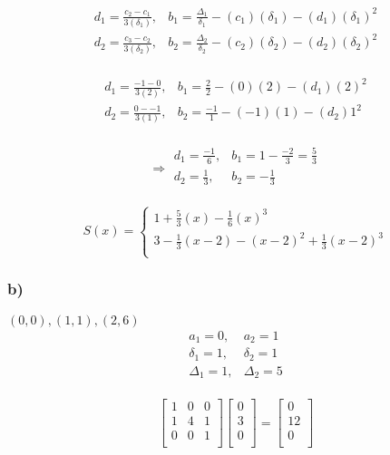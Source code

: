 \documentclass[12pt]{article}
\begin{document}
\[
\begin{array}{cc}
  d_1 = \frac{c_2 - c_1}{3(\delta_1)}, & b_1 = \frac{\Delta_1}{\delta_1} - (c_1)(\delta_1) - (d_1)(\delta_1)^2\\
  d_2 = \frac{c_3 - c_2}{3(\delta_2)}, & b_2 = \frac{\Delta_2}{\delta_2} - (c_2)(\delta_2) - (d_2)(\delta_2)^2\\
\end{array}
\]

\[
\begin{array}{cc}
  d_1 = \frac{-1 - 0}{3(2)}, & b_1 = \frac{2}{2} - (0)(2) - (d_1)(2)^2\\
  d_2 = \frac{0 - -1}{3(1)}, & b_2 = \frac{-1}{1} - (-1)(1) - (d_2)1^2\\
\end{array}
\]

\[
\Rightarrow
\begin{array}{cc}
  d_1 = \frac{-1}{6}, & b_1 = 1 - \frac{-2}{3} = \frac{5}{3}\\
  d_2 = \frac{1}{3}, & b_2 = - \frac{1}{3}\\
\end{array}
\]

\begin{displaymath}
  S(x) = \left\{
  \begin{array}{c}
    1 + \frac{5}{3}(x) - \frac{1}{6}(x)^3\\
    3 - \frac{1}{3}(x-2) -(x-2)^2 + \frac{1}{3}(x-2)^3\\
    \end{array}
  \right.
\end{displaymath}

\subsubsection*{b)}
\((0,0),(1,1),(2,6)\)\\
\[
\begin{array}{ll}
  a_1 = 0, & a_2 = 1\\
  \delta_1 = 1, &  \delta_2 = 1\\
  \Delta_1 = 1, & \Delta_2 = 5\\
\end{array}
\]

\[
\left[
\begin{array}{ccc}
  1 & 0 & 0\\
  1 & 4 & 1\\
  0 & 0 & 1\\
\end{array}
\right]
\left[
\begin{array}{c}
  0\\
  3\\
  0\\
\end{array}
\right]
=
\left[
\begin{array}{c}
  0\\
  12\\
  0\\
\end{array}
\right]
\]
\end{document}
